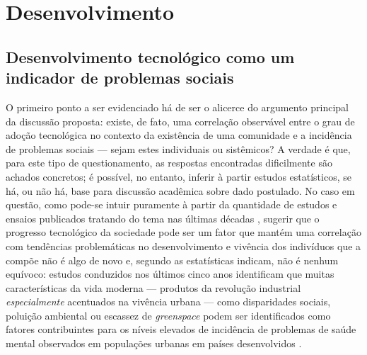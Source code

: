 \section{Desenvolvimento}

\subsection{Desenvolvimento tecnológico como um indicador de problemas sociais}\label{indicador}

O primeiro ponto a ser evidenciado há de ser o alicerce do argumento principal da discussão proposta: existe, de fato,
uma correlação observável entre o grau de adoção tecnológica no contexto da existência de uma comunidade e a incidência de
problemas sociais --- sejam estes individuais ou sistêmicos? A verdade é que, para este tipo de questionamento, as
respostas encontradas dificilmente são achados concretos; é possível, no entanto, inferir à partir estudos estatísticos, se
há, ou não há, base para discussão acadêmica sobre dado postulado. No caso em questão, como pode-se intuir puramente à partir
da quantidade de estudos e ensaios publicados tratando do tema nas últimas décadas
\cite{secretariat1977,marien1977415}, sugerir que o progresso tecnológico da sociedade pode
ser um fator que mantém uma correlação com tendências problemáticas no desenvolvimento e vivência dos indivíduos que a compõe
não é algo de novo e, segundo as estatísticas indicam, não é nenhum equívoco: estudos conduzidos nos últimos cinco anos
identificam que muitas características da vida moderna --- produtos da revolução industrial \textit{especialmente} acentuados na
vivência urbana --- como disparidades sociais, poluição ambiental ou escassez de \textit{greenspace} podem ser
identificados como fatores contribuintes para os níveis elevados de incidência de problemas de saúde mental observados
em populações urbanas em países desenvolvidos \cite[1]{XU2023299}.

